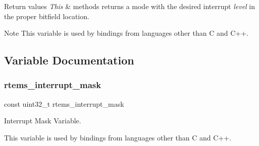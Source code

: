 \begin{DoxyRetVals}{Return values}
{\em This} & methods returns a mode with the desired interrupt {\itshape level} in the proper bitfield location.\\
\hline
\end{DoxyRetVals}
\begin{DoxyNote}{Note}
This variable is used by bindings from languages other than C and C++. 
\end{DoxyNote}


\subsection{Variable Documentation}
\mbox{\label{group__ClassicModes_ga81fe5af4a8525fcad74ad8f30a691f12}} 
\subsubsection{\texorpdfstring{rtems\_interrupt\_mask}{rtems\_interrupt\_mask}}
{\footnotesize\ttfamily const uint32\+\_\+t rtems\+\_\+interrupt\+\_\+mask}



Interrupt Mask Variable. 

This variable is used by bindings from languages other than C and C++. 